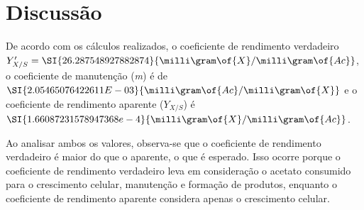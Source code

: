 \documentclass[\mainfilename]{subfiles}
\begin{document}
\begin{sectionBox}
\begin{center}
    \end{center}
    \section*{Discussão}
    De acordo com os cálculos realizados, o coeficiente de rendimento verdadeiro\\\(Y'_{X/S}=\SI{26.287548927882874}{\milli\gram\of{X}/\milli\gram\of{Ac}}\), o coeficiente de manutenção (\textit{m}) é de \(\SI{2.05465076422611E-03}{\milli\gram\of{Ac}/\milli\gram\of{X}}\) e o coeficiente de rendimento aparente (\(Y_{X/S}\)) é \(\SI{1.66087231578947368e-4}{\milli\gram\of{X}/\milli\gram\of{Ac}}\).\par
    Ao analisar ambos os valores, observa-se que o coeficiente de rendimento verdadeiro é maior do que o aparente, o que é esperado. Isso ocorre porque o coeficiente de rendimento verdadeiro leva em consideração o acetato consumido para o crescimento celular, manutenção e formação de produtos, enquanto o coeficiente de rendimento aparente considera apenas o crescimento celular.
\end{sectionBox}
\end{document}
